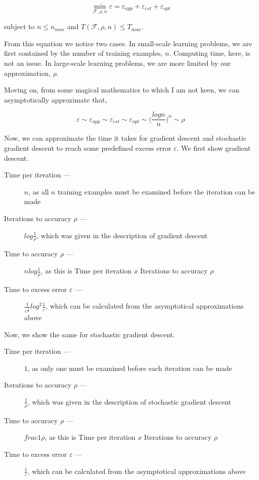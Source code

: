 \documentclass[twoside]{article}
\theoremstyle{definition}
\theoremstyle{definition}
\theoremstyle{remark}
\begin{document}
$$ \min_{\mathcal{F}, \rho, n} \varepsilon =  \varepsilon_{app}  + \varepsilon_{est} + \varepsilon_{opt}$$

subject to $n \leq n_{max}$ and $T(\mathcal{F}, \rho, n) \leq T_{max}$.

From this equation we notice two cases. In small-scale learning problems, we are first contained by the number of training examples, $n$. Computing time, here, is not an issue. In large-scale learning problems, we are more limited by our approximation, $\rho$.

Moving on, from some magical mathematics to which I am not keen, we can asymptotically approximate that,

$$\varepsilon \sim \varepsilon_{app} \sim \varepsilon_{est} \sim \varepsilon_{opt} \sim \bigg(\frac{log n}{n}\bigg)^\alpha \sim \rho$$

Now, we can approximate the time it takes for gradient descent and stochastic gradient descent to reach some predefined excess error $\varepsilon$. We first show gradient descent.

\begin{description}
	\item[Time per iteration ---] $n$, as all $n$ training examples must be examined before the iteration can be made
	\item[Iterations to accuracy $\rho$ ---] $log \frac{1}{\rho}$, which was given in the description of gradient descent
	\item[Time to accuracy $\rho$ ---] $n log \frac{1}{\rho}$, as this is Time per iteration $x$ Iterations to accuracy $\rho$
	\item[Time to excess error $\varepsilon$ ---]  $\frac{1}{\varepsilon^{\frac{1}{\alpha}}} log^2 \frac{1}{\varepsilon}$, which can be calculated from the asymptotical approximations above
\end{description}

Now, we show the same for stochastic gradient descent.

\begin{description}
	\item[Time per iteration ---] $1$, as only one must be examined before each iteration can be made
	\item[Iterations to accuracy $\rho$ ---] $\frac{1}{\rho}$, which was given in the description of stochastic gradient descent
	\item[Time to accuracy $\rho$ ---] $frac{1}{\rho}$, as this is Time per iteration $x$ Iterations to accuracy $\rho$
	\item[Time to excess error $\varepsilon$ ---]  $\frac{1}{\varepsilon}$, which can be calculated from the asymptotical approximations above
\end{description}
\end{document}

